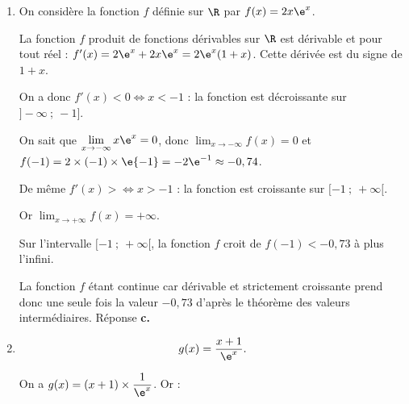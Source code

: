 
\medskip

%

\begin{enumerate}
\item On considère la fonction $f$ définie sur $\R$ par $f(x) = 2x\e^x$.

La fonction $f$ produit de fonctions dérivables sur $\R$ est dérivable et pour tout réel : $f'(x) = 2\e^x + 2x\e^x = 2\e^x(1 + x)$. Cette dérivée est du signe de $1 + x$.

On a donc $f'(x) < 0 \iff x < - 1$ : la fonction est décroissante sur $]- \infty~;~- 1]$.

On sait que $\displaystyle\lim_{x \to -\infty} x\e^x = 0$, donc $\displaystyle\lim_{x \to -\infty}f(x) = 0$ et $f(-1) = 2 \times (- 1) \times \e{-1} = - 2\e^{-1} \approx - 0,74$.

De même $f'(x) >  \iff x > - 1$ : la fonction est croissante sur $[- 1~;~+ \infty[$.

Or  $\displaystyle\lim_{x \to +\infty}f(x) = + \infty$.

Sur l'intervalle $[- 1~;~+ \infty[$, la fonction $f$ croit de $f(-1) < -0,73$ à plus l'infini.

La fonction $f$ étant continue car dérivable et strictement croissante prend donc une seule fois la valeur $-0,73$ d'après le théorème des valeurs intermédiaires. Réponse \textbf{c.}

\item %
\[g(x) = \dfrac{x+ 1}{\e^x}.\]

%
On a $g(x) = (x + 1) \times \dfrac{1}{\e^x}$. Or :


\end{enumerate}
